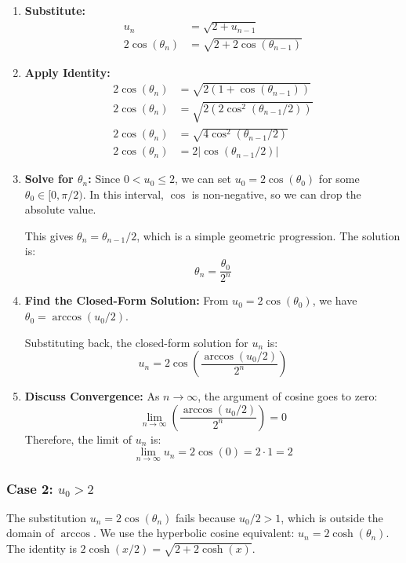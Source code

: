 \documentclass[12pt,a4paper]{article}
\theoremstyle{definition}
\begin{document}
\begin{enumerate}[label=\arabic*.]
    \item \textbf{Substitute:}
    \begin{align*}
    u_n &= \sqrt{2 + u_{n-1}}\\
    2\cos(\theta_n) &= \sqrt{2 + 2\cos(\theta_{n-1})}
    \end{align*}
    
    \item \textbf{Apply Identity:}
    \begin{align*}
    2\cos(\theta_n) &= \sqrt{2(1 + \cos(\theta_{n-1}))}\\
    2\cos(\theta_n) &= \sqrt{2(2\cos^2(\theta_{n-1}/2))}\\
    2\cos(\theta_n) &= \sqrt{4\cos^2(\theta_{n-1}/2)}\\
    2\cos(\theta_n) &= 2|\cos(\theta_{n-1}/2)|
    \end{align*}
    
    \item \textbf{Solve for $\theta_n$:}
    Since $0 < u_0 \le 2$, we can set $u_0 = 2\cos(\theta_0)$ for some $\theta_0 \in [0, \pi/2)$. In this interval, $\cos$ is non-negative, so we can drop the absolute value.
    
    This gives $\theta_n = \theta_{n-1}/2$, which is a simple geometric progression. The solution is:
    \[
    \theta_n = \frac{\theta_0}{2^n}
    \]
    
    \item \textbf{Find the Closed-Form Solution:}
    From $u_0 = 2\cos(\theta_0)$, we have $\theta_0 = \arccos(u_0/2)$.
    
    Substituting back, the closed-form solution for $u_n$ is:
    \[
    u_n = 2\cos\left(\frac{\arccos(u_0/2)}{2^n}\right)
    \]
    
    \item \textbf{Discuss Convergence:}
    As $n \to \infty$, the argument of cosine goes to zero:
    \[
    \lim_{n \to \infty} \left(\frac{\arccos(u_0/2)}{2^n}\right) = 0
    \]
    Therefore, the limit of $u_n$ is:
    \[
    \lim_{n \to \infty} u_n = 2\cos(0) = 2 \cdot 1 = 2
    \]
\end{enumerate}

\subsubsection{Case 2: $u_0 > 2$}

The substitution $u_n = 2\cos(\theta_n)$ fails because $u_0/2 > 1$, which is outside the domain of $\arccos$. We use the hyperbolic cosine equivalent: \textbf{$u_n = 2\cosh(\theta_n)$}. The identity is $2\cosh(x/2) = \sqrt{2 + 2\cosh(x)}$.
\end{document}
